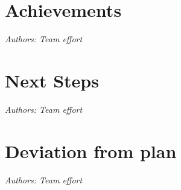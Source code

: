 \documentclass[sigchi-a, authorversion]{acmart}
\begin{document}


\section{Achievements}
\textit{Authors: Team effort}\\

\section{Next Steps}
\textit{Authors: Team effort}\\

\section{Deviation from plan}
\textit{Authors: Team effort}\\

\nocite{*}


\end{document}
